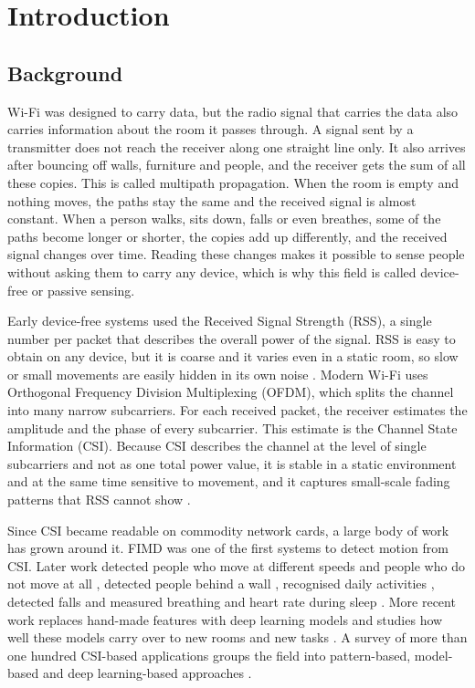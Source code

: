 \chapter{Introduction}

\section{Background}
Wi-Fi was designed to carry data, but the radio signal that carries the data also carries information about the room it passes through. A signal sent by a transmitter does not reach the receiver along one straight line only. It also arrives after bouncing off walls, furniture and people, and the receiver gets the sum of all these copies. This is called multipath propagation. When the room is empty and nothing moves, the paths stay the same and the received signal is almost constant. When a person walks, sits down, falls or even breathes, some of the paths become longer or shorter, the copies add up differently, and the received signal changes over time. Reading these changes makes it possible to sense people without asking them to carry any device, which is why this field is called device-free or passive sensing.

Early device-free systems used the Received Signal Strength (RSS), a single number per packet that describes the overall power of the signal. RSS is easy to obtain on any device, but it is coarse and it varies even in a static room, so slow or small movements are easily hidden in its own noise \cite{fimd,pads}. Modern Wi-Fi uses Orthogonal Frequency Division Multiplexing (OFDM), which splits the channel into many narrow subcarriers. For each received packet, the receiver estimates the amplitude and the phase of every subcarrier. This estimate is the Channel State Information (CSI). Because CSI describes the channel at the level of single subcarriers and not as one total power value, it is stable in a static environment and at the same time sensitive to movement, and it captures small-scale fading patterns that RSS cannot show \cite{fimd,eeyes}.

Since CSI became readable on commodity network cards, a large body of work has grown around it. FIMD \cite{fimd} was one of the first systems to detect motion from CSI. Later work detected people who move at different speeds \cite{pads} and people who do not move at all \cite{deman}, detected people behind a wall \cite{thude,wiborder,alpd,wifileaks}, recognised daily activities \cite{eeyes,carm,carmjsac}, detected falls \cite{wifall,antifall,rtfall,falldefi} and measured breathing and heart rate during sleep \cite{vitalsigns}. More recent work replaces hand-made features with deep learning models and studies how well these models carry over to new rooms and new tasks \cite{sensefi,autofi}. A survey of more than one hundred CSI-based applications groups the field into pattern-based, model-based and deep learning-based approaches \cite{survey2019}.

